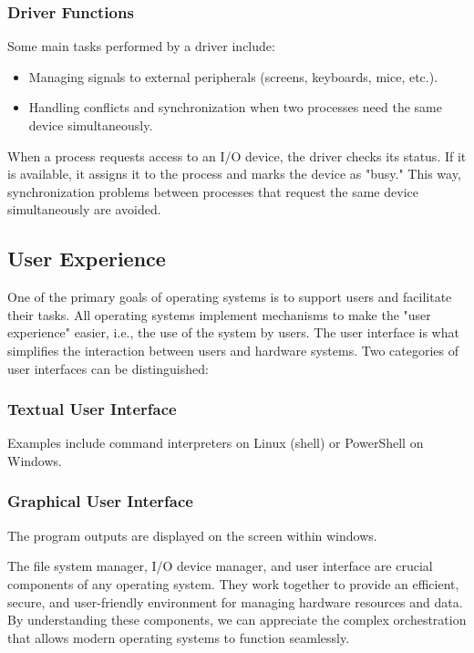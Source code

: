 \subsubsection{Driver Functions}
Some main tasks performed by a driver include:

\begin{itemize}
    \item Managing signals to external peripherals (screens, keyboards, mice, etc.).
    \item Handling conflicts and synchronization when two processes need the same device simultaneously.
\end{itemize}

When a process requests access to an I/O device, the driver checks its status. If it is available, it assigns it to the process and marks the device as "busy." This way, synchronization problems between processes that request the same device simultaneously are avoided.

\subsection{User Experience}
One of the primary goals of operating systems is to support users and facilitate their tasks. All operating systems implement mechanisms to make the "user experience" easier, i.e., the use of the system by users. The user interface is what simplifies the interaction between users and hardware systems. Two categories of user interfaces can be distinguished:

\subsubsection{Textual User Interface}
Examples include command interpreters on Linux (shell) or PowerShell on Windows.

\subsubsection{Graphical User Interface}
The program outputs are displayed on the screen within windows.

The file system manager, I/O device manager, and user interface are crucial components of any operating system. They work together to provide an efficient, secure, and user-friendly environment for managing hardware resources and data. By understanding these components, we can appreciate the complex orchestration that allows modern operating systems to function seamlessly.

